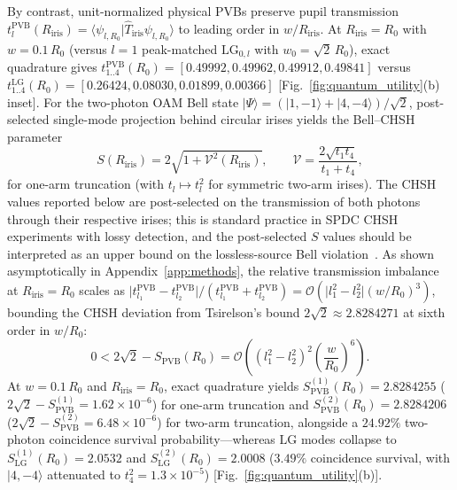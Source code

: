 \documentclass[aps,pra,onecolumn,notitlepage,11pt,tightenlines,nofootinbib,floatfix,longbibliography]{revtex4-2}
\newcommand{\braket}[2]{\langle #1 | #2 \rangle}
\newcommand{\ket}[1]{| #1 \rangle}
\newcommand{\abs}[1]{\lvert #1 \rvert}
\begin{document}
By contrast, unit-normalized physical PVBs preserve pupil transmission $t_l^{\mathrm{PVB}}(R_{\mathrm{iris}}) = \braket{\psi_{l,R_0}}{\hat{T}_{\mathrm{iris}}\psi_{l,R_0}}$ to leading order in $w/R_{\mathrm{iris}}$. At $R_{\mathrm{iris}} = R_0$ with $w = 0.1\,R_0$ (versus $l=1$ peak-matched $\mathrm{LG}_{0,l}$ with $w_0 = \sqrt{2}\,R_0$), exact quadrature gives $t_{1..4}^{\mathrm{PVB}}(R_0) = [0.49992, 0.49962, 0.49912, 0.49841]$ versus $t_{1..4}^{\mathrm{LG}}(R_0) = [0.26424, 0.08030, 0.01899, 0.00366]$ [Fig.~\ref{fig:quantum_utility}(b) inset]. For the two-photon OAM Bell state $\ket{\Psi} = (\ket{1,-1} + \ket{4,-4})/\sqrt{2}$, post-selected single-mode projection behind circular irises yields the Bell--CHSH parameter~\cite{Clauser1969}
\begin{equation}
S(R_{\mathrm{iris}}) = 2\sqrt{1 + \mathcal{V}^2(R_{\mathrm{iris}})}, \qquad \mathcal{V} = \frac{2\sqrt{t_1 t_4}}{t_1 + t_4},
\label{eq:iris_chsh}
\end{equation}
for one-arm truncation (with $t_l \mapsto t_l^2$ for symmetric two-arm irises). The CHSH values reported below are post-selected on the transmission of both photons through their respective irises; this is standard practice in SPDC CHSH experiments with lossy detection, and the post-selected $S$ values should be interpreted as an upper bound on the lossless-source Bell violation~\cite{Walborn2010}. As shown asymptotically in Appendix~\ref{app:methods}, the relative transmission imbalance at $R_{\mathrm{iris}} = R_0$ scales as $\abs{t_{l_1}^{\mathrm{PVB}} - t_{l_2}^{\mathrm{PVB}}}/(t_{l_1}^{\mathrm{PVB}} + t_{l_2}^{\mathrm{PVB}}) = \mathcal{O}(\abs{l_1^2 - l_2^2}(w/R_0)^3)$, bounding the CHSH deviation from Tsirelson's bound $2\sqrt{2} \approx 2.8284271$ at sixth order in $w/R_0$:
\begin{equation}
0 < 2\sqrt{2} - S_{\mathrm{PVB}}(R_0) = \mathcal{O}\!\left((l_1^2 - l_2^2)^2 \left(\frac{w}{R_0}\right)^6\right).
\label{eq:chsh_error_bound}
\end{equation}
At $w = 0.1\,R_0$ and $R_{\mathrm{iris}} = R_0$, exact quadrature yields $S_{\mathrm{PVB}}^{(1)}(R_0) = 2.8284255$ ($2\sqrt{2} - S_{\mathrm{PVB}}^{(1)} = 1.62\times 10^{-6}$) for one-arm truncation and $S_{\mathrm{PVB}}^{(2)}(R_0) = 2.8284206$ ($2\sqrt{2} - S_{\mathrm{PVB}}^{(2)} = 6.48\times 10^{-6}$) for two-arm truncation, alongside a $24.92\%$ two-photon coincidence survival probability---whereas $\mathrm{LG}$ modes collapse to $S_{\mathrm{LG}}^{(1)}(R_0) = 2.0532$ and $S_{\mathrm{LG}}^{(2)}(R_0) = 2.0008$ ($3.49\%$ coincidence survival, with $\ket{4,-4}$ attenuated to $t_4^2 = 1.3\times 10^{-5}$) [Fig.~\ref{fig:quantum_utility}(b)].
\end{document}
